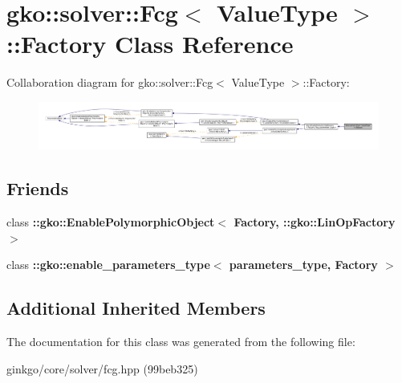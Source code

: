 \hypertarget{classgko_1_1solver_1_1Fcg_1_1Factory}{}\section{gko\+:\+:solver\+:\+:Fcg$<$ Value\+Type $>$\+:\+:Factory Class Reference}
\label{classgko_1_1solver_1_1Fcg_1_1Factory}


Collaboration diagram for gko\+:\+:solver\+:\+:Fcg$<$ Value\+Type $>$\+:\+:Factory\+:
\nopagebreak
\begin{figure}[H]
\begin{center}
\leavevmode
\includegraphics[width=350pt]{classgko_1_1solver_1_1Fcg_1_1Factory__coll__graph}
\end{center}
\end{figure}
\subsection*{Friends}
\begin{DoxyCompactItemize}
\item 
\mbox{\label{classgko_1_1solver_1_1Fcg_1_1Factory_a27e9bbc94a1c1c59f40833153eda8f78}} 
class {\bfseries \+::gko\+::\+Enable\+Polymorphic\+Object$<$ Factory, \+::gko\+::\+Lin\+Op\+Factory $>$}
\item 
\mbox{\label{classgko_1_1solver_1_1Fcg_1_1Factory_a0d176cbd42d6214e11aee8c30ca256fc}} 
class {\bfseries \+::gko\+::enable\+\_\+parameters\+\_\+type$<$ parameters\+\_\+type, Factory $>$}
\end{DoxyCompactItemize}
\subsection*{Additional Inherited Members}


The documentation for this class was generated from the following file\+:\begin{DoxyCompactItemize}
\item 
ginkgo/core/solver/fcg.\+hpp (99beb325)\end{DoxyCompactItemize}
